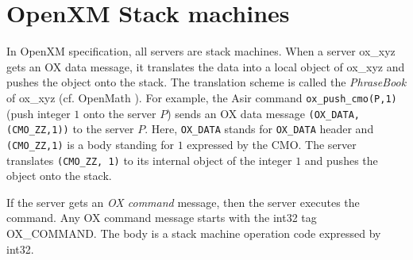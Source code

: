 
\section{OpenXM Stack machines}\label{sec:ox-stackmachines}

In OpenXM specification, all servers are stack machines.
When a server ox\_xyz gets an OX data message,
it translates the data into a local object of ox\_xyz
and pushes the object onto the stack.
The translation scheme 
is called the {\it PhraseBook} of ox\_xyz (cf. OpenMath \cite{OpenMath}).
For example, the Asir command {\tt ox\_push\_cmo(P,1)}
(push integer $1$ onto the server $P$)
sends an OX data message
{\tt (OX\_DATA,(CMO\_ZZ,1))} to the server $P$.
Here,
{\tt OX\_DATA} stands for {\tt OX\_DATA} header and 
{\tt (CMO\_ZZ,1)} is a body standing for $1$ expressed 
by the CMO.
The server translates {\tt (CMO\_ZZ, 1)} to its internal object of
the integer  $1$
and pushes the object onto the stack.

If the server gets an {\it OX command} message, then the server 
executes the command.
Any OX command message starts with the int32 tag OX\_COMMAND.
The body is a stack machine operation code expressed by int32.

